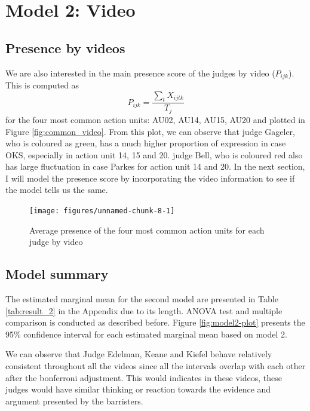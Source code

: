 \documentclass{monashthesis}
\begin{document}
\newpage

\hypertarget{model-2-video-1}{%
\section{Model 2: Video}\label{model-2-video-1}}

\hypertarget{presence-by-videos}{%
\subsection{Presence by videos}\label{presence-by-videos}}

We are also interested in the main presence score of the judges by video (\(P_{ijk}\)). This is computed as \[P_{ijk} = \frac{\sum_{t}X_{ijtk}}{T_j}\] for the four most common action units: AU02, AU14, AU15, AU20 and plotted in Figure \ref{fig:common_video}. From this plot, we can observe that judge Gageler, who is coloured as green, has a much higher proportion of expression in case OKS, especially in action unit 14, 15 and 20. judge Bell, who is coloured red also has large fluctuation in case Parkes for action unit 14 and 20. In the next section, I will model the presence score by incorporating the video information to see if the model tells us the same.

\begin{figure}

{\centering \texttt{[image: figures/unnamed-chunk-8-1]} 

}

\caption{Average presence of the four most common action units for each judge by video\label{fig:common_video}}\label{fig:unnamed-chunk-8}
\end{figure}

\hypertarget{model-summary-1}{%
\subsection{Model summary}\label{model-summary-1}}

The estimated marginal mean for the second model are presented in Table \ref{tab:result_2} in the Appendix due to its length. ANOVA test and multiple comparison is conducted as described before. Figure \ref{fig:model2-plot} presents the 95\% confidence interval for each estimated marginal mean based on model 2.

We can observe that Judge Edelman, Keane and Kiefel behave relatively consistent throughout all the videos since all the intervals overlap with each other after the bonferroni adjustment. This would indicates in these videos, these judges would have similar thinking or reaction towards the evidence and argument presented by the barristers.
\end{document}

